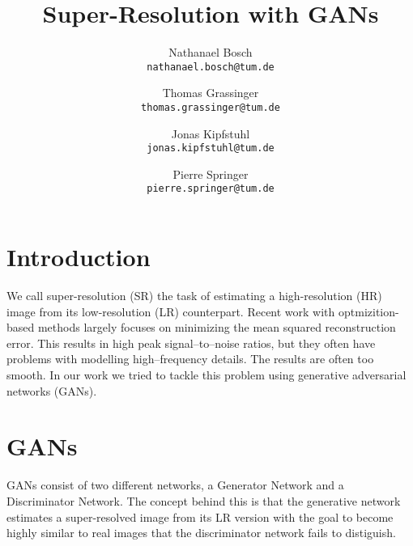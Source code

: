 \documentclass[10pt,twocolumn,letterpaper]{article}
\begin{document}
\title{Super-Resolution with GANs}

\author{Nathanael Bosch\\
{\tt\small nathanael.bosch@tum.de}
\and
Thomas Grassinger\\
{\tt\small thomas.grassinger@tum.de}
\and
Jonas Kipfstuhl\\
{\tt\small jonas.kipfstuhl@tum.de}
\and
Pierre Springer\\
{\tt\small pierre.springer@tum.de}
}


\maketitle

\section{Introduction}
We call super-resolution (SR) the task of estimating a high-resolution
(HR) image from its low-resolution (LR) counterpart. Recent work with
optmizition-based methods largely focuses on minimizing the mean
squared reconstruction error. This results in high peak
signal--to--noise ratios, but they often have problems with modelling
high--frequency details. The results are often too smooth. In our work
we tried to tackle this problem using generative adversarial networks
(GANs).


\section{GANs}
GANs consist of two different networks, a Generator Network and a
Discriminator Network. The concept behind this is that the generative
network estimates a super-resolved image from its LR version with the
goal to become highly similar to real images that the discriminator
network fails to distiguish.
\end{document}
